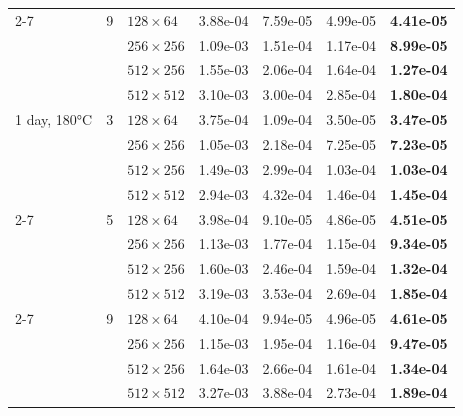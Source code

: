 \begin{table}[htb]
\begin{tabular}{l l l  c c c c}
    \cmidrule(lr){2-7}
     & 9 & $128\times64$ & 3.88e-04 & 7.59e-05 & 4.99e-05 & \textbf{4.41e-05} \\
     &  & $256\times256$ & 1.09e-03 & 1.51e-04 & 1.17e-04 & \textbf{8.99e-05} \\
     &  & $512\times256$ & 1.55e-03 & 2.06e-04 & 1.64e-04 & \textbf{1.27e-04} \\
     &  & $512\times512$ & 3.10e-03 & 3.00e-04 & 2.85e-04 & \textbf{1.80e-04} \\
    \midrule
    1 day, 180°C & 3 & $128\times64$ & 3.75e-04 & 1.09e-04 & 3.50e-05 & \textbf{3.47e-05} \\
     &  & $256\times256$ & 1.05e-03 & 2.18e-04 & 7.25e-05 & \textbf{7.23e-05} \\
     &  & $512\times256$ & 1.49e-03 & 2.99e-04 & 1.03e-04 & \textbf{1.03e-04} \\
     &  & $512\times512$ & 2.94e-03 & 4.32e-04 & 1.46e-04 & \textbf{1.45e-04} \\
    \cmidrule(lr){2-7}
     & 5 & $128\times64$ & 3.98e-04 & 9.10e-05 & 4.86e-05 & \textbf{4.51e-05} \\
     &  & $256\times256$ & 1.13e-03 & 1.77e-04 & 1.15e-04 & \textbf{9.34e-05} \\
     &  & $512\times256$ & 1.60e-03 & 2.46e-04 & 1.59e-04 & \textbf{1.32e-04} \\
     &  & $512\times512$ & 3.19e-03 & 3.53e-04 & 2.69e-04 & \textbf{1.85e-04} \\
    \cmidrule(lr){2-7}
     & 9 & $128\times64$ & 4.10e-04 & 9.94e-05 & 4.96e-05 & \textbf{4.61e-05} \\
     &  & $256\times256$ & 1.15e-03 & 1.95e-04 & 1.16e-04 & \textbf{9.47e-05} \\
     &  & $512\times256$ & 1.64e-03 & 2.66e-04 & 1.61e-04 & \textbf{1.34e-04} \\
     &  & $512\times512$ & 3.27e-03 & 3.88e-04 & 2.73e-04 & \textbf{1.89e-04} \\
    \bottomrule
    \end{tabular}
\end{table}
